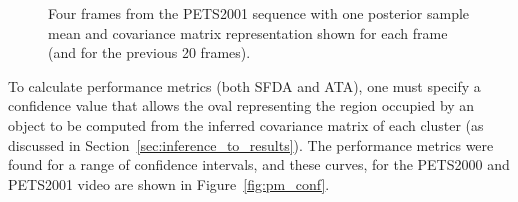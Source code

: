 \documentclass[smallcondensed, final]{svjour3}
\begin{document}
\begin{figure}
  \centering               
   \hspace{1pt}
   \hspace{1pt}
   \hspace{1pt}
  \caption{Four frames from the PETS2001 sequence with one posterior sample mean and covariance matrix representation shown for each frame (and for the previous 20 frames).}
  \label{fig:pets2001_overlay}
\end{figure}

To calculate performance metrics (both SFDA and ATA), one must specify a confidence value that allows the oval representing the region occupied by an object to be computed from the inferred covariance matrix of each cluster (as discussed in Section~\ref{sec:inference_to_results}). The performance metrics were found for a range of confidence intervals, and these curves, for the PETS2000 and PETS2001 video are shown in Figure~\ref{fig:pm_conf}.
\end{document}
